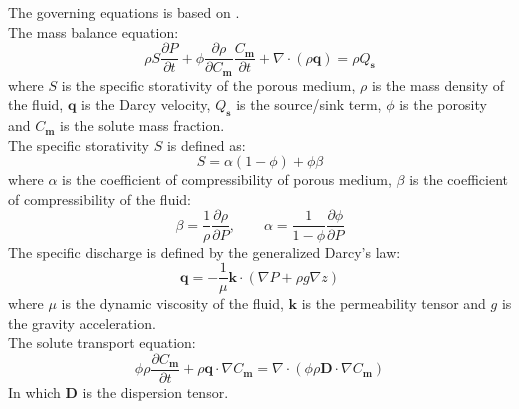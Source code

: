 \documentclass[review]{elsarticle}
\newcommand{\mbf}[1]{{\mathbf{#1}}}%
\begin{document}
The governing equations is based on \cite{ackerer1999modeling}. \\
The mass balance equation: 
\begin{equation}\label{eq:mass_conserv}
\rho S\frac{\partial P}{\partial t} + \phi \frac{\partial \rho}{\partial C_\mbf{m}}\frac{C_\mbf{m}}{\partial t} + \nabla\cdot(\rho\mbf{q}) = \rho Q_\mbf{s}
\end{equation}
where $S$ is the specific storativity of the porous medium, $\rho$ is the mass density of the fluid, $\mbf{q}$ is the Darcy velocity, $Q_\mbf{s}$ is the source/sink term, $\phi$ is the porosity and $C_\mbf{m}$ is the solute mass fraction. \\
The specific storativity $S$ is defined as:
\begin{equation}\label{eq:specific_S}
S = \alpha (1 - \phi) + \phi \beta
\end{equation} 
where $\alpha$ is the coefficient of compressibility of porous medium, $\beta$ is the coefficient of compressibility of the fluid:
\begin{equation}\label{eq:beta_alpha}
\beta = \frac{1}{\rho}\frac{\partial \rho}{\partial P}, \qquad \alpha = \frac{1}{1 - \phi}\frac{\partial \phi}{\partial P}
\end{equation}
The specific discharge is defined by the generalized Darcy's law:
\begin{equation}\label{eq:darcy_velocity}
\mbf{q} = - \frac{1}{\mu}\mbf{k}\cdot(\nabla P + \rho g \nabla z)
\end{equation}
where $\mu$ is the dynamic viscosity of the fluid, $\mbf{k}$ is the permeability tensor and $g$ is the gravity acceleration. \\
The solute transport equation:
\begin{equation}
\phi \rho \frac{\partial C_\mbf{m}}{\partial t} + \rho \mbf{q}\cdot\nabla C_\mbf{m} = \nabla\cdot(\phi \rho \mbf{D}\cdot\nabla C_\mbf{m})
\end{equation}
In which $\mbf{D}$ is the dispersion tensor. \par
\end{document}
